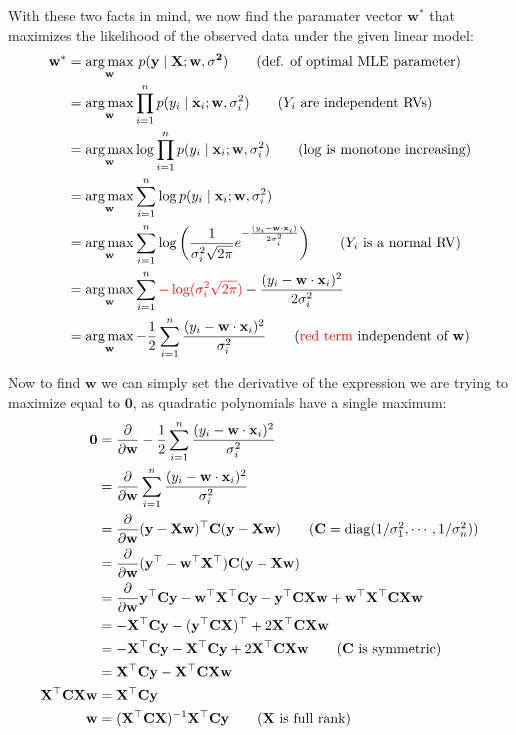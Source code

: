 \documentclass{article}
\renewcommand{\vec}[1]{\mathbf{#1}}
\newcommand{\mat}[1]{\mathbf{#1}}
\DeclareMathOperator*{\argmax}{arg\,max}
\begin{document}
With these two facts in mind, we now find the paramater vector $\vec w^*$ that maximizes the likelihood of the observed data under the given linear model:
\begin{align*}
    \vec w^*&=\argmax_{\vec w}\,p(\vec y\mid\mat X;\vec w, \vec{\sigma^2})\tag{def. of optimal MLE parameter}\\
    &=\argmax_{\vec w}\prod_{i=1}^np(y_i\mid \vec x_i;\vec w,\sigma^2_i)\tag{$Y_i$ are independent RVs}\\
    &=\argmax_{\vec w}\log\prod_{i=1}^np(y_i\mid \vec x_i;\vec w,\sigma^2_i)\tag{$\log$ is monotone increasing}\\
    &=\argmax_{\vec w}\sum_{i=1}^n\log p(y_i\mid \vec x_i;\vec w,\sigma^2_i)\\
    &=\argmax_{\vec w}\sum_{i=1}^n\log\left(\frac{1}{\sigma^2_i\sqrt{2\pi}}e^{-\frac{(y_i-\vec w\cdot\vec x_i)}{2\sigma^2_i}}\right)\tag{$Y_i$ is a normal RV}\\
    &=\argmax_{\vec w}\sum_{i=1}^n\textcolor{red}{-\log(\sigma^2_i\sqrt{2\pi})}-\frac{(y_i-\vec w\cdot\vec x_i)^2}{2\sigma^2_i}\\
    &=\argmax_{\vec w}-\frac{1}{2}\sum_{i=1}^n\frac{(y_i-\vec w\cdot\vec x_i)^2}{\sigma^2_i}\tag{$\textcolor{red}{\text{red term}}$ independent of $\vec w$}\\
\end{align*}

Now to find $\vec w$ we can simply set the derivative of the expression we are trying to maximize equal to $\vec 0$, as quadratic polynomials have a single maximum:
\begin{align*}
    \vec 0&=\frac{\partial}{\partial\vec w}-\frac{1}{2}\sum_{i=1}^n\frac{(y_i-\vec w\cdot\vec x_i)^2}{\sigma^2_i}\\
    &=\frac{\partial}{\partial\vec w}\sum_{i=1}^n\frac{(y_i-\vec w\cdot\vec x_i)^2}{\sigma^2_i}\\
    &=\frac{\partial}{\partial\vec w}(\vec y-\mat X\vec w)^\top\mat C(\vec y-\mat X\vec w)\tag{$\mat C=\operatorname{diag}(1/\sigma^2_1,\cdots,1/\sigma^2_n)$}\\
    &=\frac{\partial}{\partial\vec w}(\vec y^\top-\vec w^\top\mat X^\top)\mat C(\vec y-\mat X\vec w)\\
    &=\frac{\partial}{\partial\vec w}\vec y^\top\mat C\vec y-\vec w^\top\mat X^\top\mat C\vec y-\vec y^\top\mat C\mat X\vec w+\vec w^\top\mat X^\top\mat C\mat X\vec w\\
    &=-\mat X^\top\mat C\vec y-(\vec y^\top\mat C\mat X)^\top+2\mat X^\top\mat C\mat X\vec w\\
    &=-\mat X^\top\mat C\vec y-\mat X^\top\mat C\vec y+2\mat X^\top\mat C\mat X\vec w\tag{$\mat C$ is symmetric}\\
    &=\mat X^\top\mat C\vec y-\mat X^\top\mat C\mat X\vec w\\
    \mat X^\top\mat C\mat X\vec w&=\mat X^\top\mat C\vec y\\
    \vec w&=(\mat X^\top\mat C\mat X)^{-1}\mat X^\top\mat C\vec y\tag{$\mat X$ is full rank}
\end{align*}
\end{document}
